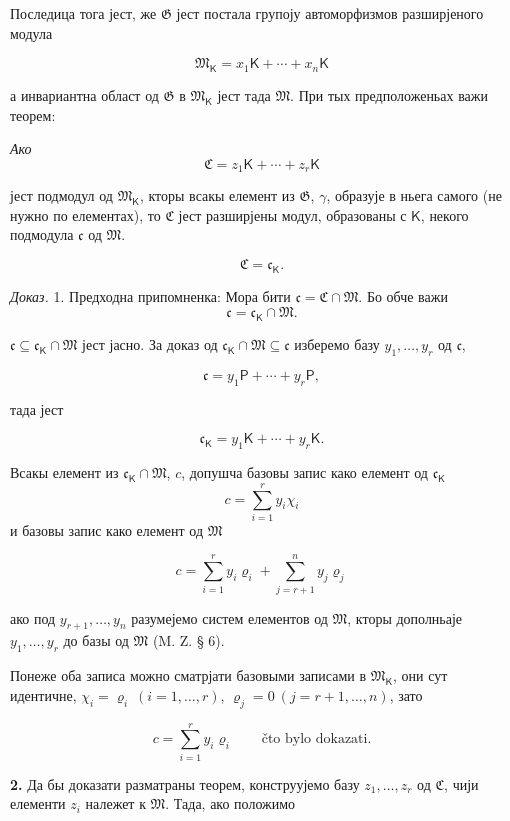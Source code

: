 \documentclass[11pt]{article}
\begin{document}
Последица тога јест, же \(\mathfrak G\) јест постала групоју автоморфизмов разширјеного модула

\[
\mathfrak M_{\mathsf K}=x_1\mathsf K+\cdots+x_n\mathsf K
\]

а инвариантна област од \(\mathfrak G\) в \(\mathfrak M_{\mathsf K}\) јест тада \(\mathfrak M\). При тых предположеньах важи теорем:

\begingroup\itshape
Ако
\[
\mathfrak C=z_1\mathsf K+\cdots+z_r\mathsf K
\]

јест подмодул од \(\mathfrak M_{\mathsf K}\), кторы всакы елемент из \(\mathfrak G\), \(\gamma\), образује в ньега самого (не нужно по елементах), то \(\mathfrak C\) јест разширјены модул, образованы с \(\mathsf K\), некого подмодула \(\mathfrak c\) од \(\mathfrak M\).

\[
\mathfrak C=\mathfrak c_{\mathsf K}.
\]
\endgroup

\emph{Доказ.} 1. Предходна припомненка: Мора бити \(\mathfrak c=\mathfrak C\cap\mathfrak M\). Бо обче важи
\[
\mathfrak c=\mathfrak c_{\mathsf K}\cap\mathfrak M.
\]

\(\mathfrak c\subseteq\mathfrak c_{\mathsf K}\cap\mathfrak M\) јест јасно. За доказ од \(\mathfrak c_{\mathsf K}\cap\mathfrak M\subseteq\mathfrak c\) изберемо базу \(y_1,\ldots,y_r\) од \(\mathfrak c\),

\[
\mathfrak c=y_1\mathsf P+\cdots+y_r\mathsf P,
\]

тада јест

\[
\mathfrak c_{\mathsf K}=y_1\mathsf K+\cdots+y_r\mathsf K.
\]

Всакы елемент из \(\mathfrak c_{\mathsf K}\cap\mathfrak M\), \(c\), допушча базовы запис како елемент од \(\mathfrak c_{\mathsf K}\)
\[
c=\sum_{i=1}^{r}y_i\chi_i
\]
и базовы запис како елемент од \(\mathfrak M\)

\[
c=\sum_{i=1}^{r}y_i\varrho_i+\sum_{j=r+1}^{n}y_j\varrho_j
\]

ако под \(y_{r+1},\ldots,y_n\) разумејемо систем елементов од \(\mathfrak M\), кторы дополньаје \(y_1,\ldots,y_r\) до базы од \(\mathfrak M\) (M. Z. § 6).

Понеже оба записа можно сматрјати базовыми записами в \(\mathfrak M_{\mathsf K}\), они сут идентичне, \(\chi_i=\varrho_i\ (i=1,\ldots,r)\), \(\varrho_j=0\ (j=r+1,\ldots,n)\), зато

\[
c=\sum_{i=1}^{r}y_i\varrho_i
\qquad\text{čto bylo dokazati.}
\]

\textbf{2.} Да бы доказати разматраны теорем, конструујемо базу \(z_1,\ldots,z_r\) од \(\mathfrak C\), чији елементи \(z_i\) належет к \(\mathfrak M\). Тада, ако положимо
\end{document}
